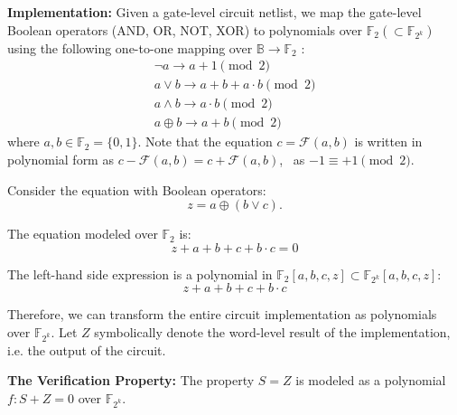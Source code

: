 {\bf Implementation:} Given a gate-level circuit netlist, we map the gate-level
Boolean operators (AND, OR, NOT, XOR) to polynomials over
$\mathbb{F}_2 (\subset \mathbb{F}_{2^k})$ using the following
one-to-one mapping over $\mathbb{B} \rightarrow \mathbb{F}_2$ : 
\begin{equation}
\label{b2poly}
\begin{split}
\neg a\rightarrow a+1 \pmod 2  \\  
a \vee b \rightarrow a+b+a\cdot b \pmod 2  \\ 
a \wedge b \rightarrow a\cdot b \pmod 2  \\ 
a \oplus b \rightarrow a+b \pmod 2 
\end{split}
\end{equation}
where $a,b \in \mathbb{F}_{2}=\{0,1\}$.
Note that the equation $c=\mathcal{F}(a,b)$ is written in polynomial
form as $c-\mathcal{F}(a,b)=c+\mathcal{F}(a,b)$, ~as $-1 \equiv +1
\pmod 2$. 



\begin{Example}
Consider the equation with Boolean operators: 
\begin{equation}
z=a \oplus (b \vee c). \nonumber
\end{equation}

The equation modeled over $\mathbb{F}_{2}$ is:
\begin{equation}
z+a + b + c + b\cdot c=0 \nonumber
\end{equation}  

The left-hand side expression is a polynomial in
$\mathbb{F}_{2}\left[a,b,c,z\right] \subset
\mathbb{F}_{2^{k}}\left[a,b,c,z\right]$: 
\begin{equation}
z+a + b + c + b\cdot c \nonumber
\end{equation}  
\end{Example}

Therefore, we can transform the entire circuit implementation as
polynomials over $\mathbb{F}_{2^k}$.  Let $Z$ symbolically denote the
word-level result of the implementation, i.e. the output of the
circuit.   

{\bf The Verification Property:}
The property $S=Z$ is modeled as a polynomial  $f: S+Z=0$ over
$\mathbb{F}_{2^k}$. 

